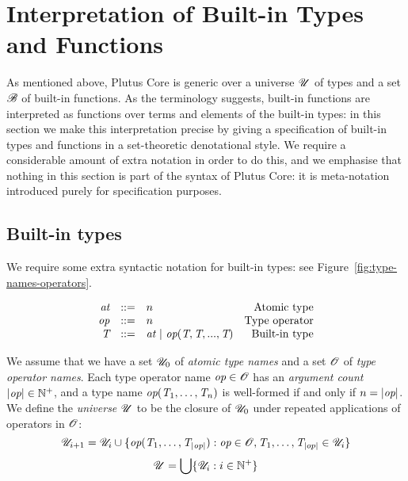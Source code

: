 \section{Interpretation of Built-in Types and Functions}
\label{sec:specify-builtins}
As mentioned above, Plutus Core is generic over a universe $\mathscr{U}$ of types and
a set $\mathscr{B}$ of built-in functions.  As the terminology suggests, built-in
functions are interpreted as functions over terms and elements of the built-in
types: in this section we make this interpretation precise by giving a
specification of built-in types and functions in a set-theoretic denotational
style.  We require a considerable amount of extra notation in order to do this,
and we emphasise that nothing in this section is part of the syntax of Plutus
Core: it is meta-notation introduced purely for specification purposes.


\subsection{Built-in types}
\label{sec:built-in-types}
We require some extra syntactic notation for built-in types: see Figure~\ref{fig:type-names-operators}.

\begin{minipage}{\linewidth}
    \centering
    \[\begin{array}{rclr}
    \textit{at}    & ::= & n & \textrm{Atomic type}\\
     \textit{op}             & ::= & n & \textrm{Type operator}\\
     \textit{T}             & ::= & \textit{at} \ | \ \textit{op}(\textit{T},\textit{T},...,\textit{T}) & \textrm{Built-in type}\\
    \end{array}\]
    \label{fig:type-names-operators}
\end{minipage}

\medskip
\noindent
We assume that we have a set $\mathscr{U}_0$ of \textit{atomic type names} and a set $\mathscr{O}$
of \textit{type operator names}.  Each type operator name $\textit{op} \in \mathscr{O}$ has an
\textit{argument count} $\left| \textit{op} \right| \in \mathbb{N}^{+}$, and a type name $\textit{op}(\textit{T}_1,
\ldots, \textit{T}_n)$ is well-formed if and only if $n = \left| \textit{op} \right|$.  We define
the \textit{universe} $\mathscr{U}$ to be the closure of $\mathscr{U}_0$ under repeated
applications of operators in $\mathscr{O}$:
$$
\mathscr{U}_{i+1} = \mathscr{U}_i \cup \{\textit{op}(\textit{T}_1, \ldots, \textit{T}_{\left| \textit{op} \right|}): \textit{op} \in \mathscr{O}, \textit{T}_1, \ldots, \textit{T}_{\left| op \right|} \in \mathscr{U}_i\}
$$
$$
\mathscr{U} = \bigcup\{\mathscr{U}_i: i \in \mathbb{N}^{+}\}
$$%
%
%
%
%

